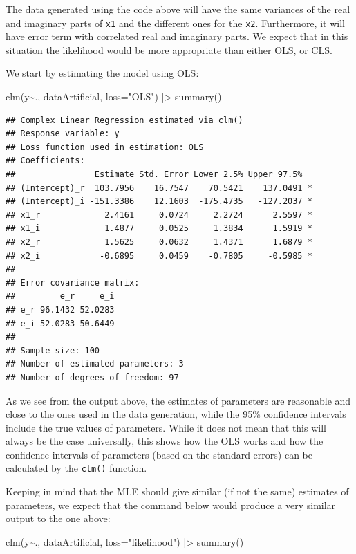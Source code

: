 \documentclass[
]{book}
\newenvironment{Shaded}{\begin{snugshade}}{\end{snugshade}}
\newcommand{\AttributeTok}[1]{\textcolor[rgb]{0.77,0.63,0.00}{#1}}
\newcommand{\FunctionTok}[1]{\textcolor[rgb]{0.00,0.00,0.00}{#1}}
\newcommand{\NormalTok}[1]{#1}
\newcommand{\SpecialCharTok}[1]{\textcolor[rgb]{0.00,0.00,0.00}{#1}}
\newcommand{\StringTok}[1]{\textcolor[rgb]{0.31,0.60,0.02}{#1}}
\begin{document}
The data generated using the code above will have the same variances of the real and imaginary parts of \texttt{x1} and the different ones for the \texttt{x2}. Furthermore, it will have error term with correlated real and imaginary parts. We expect that in this situation the likelihood would be more appropriate than either OLS, or CLS.

We start by estimating the model using OLS:

\begin{Shaded}
\begin{Highlighting}[]
\FunctionTok{clm}\NormalTok{(y}\SpecialCharTok{\textasciitilde{}}\NormalTok{., dataArtificial, }\AttributeTok{loss=}\StringTok{"OLS"}\NormalTok{) }\SpecialCharTok{|\textgreater{}}
    \FunctionTok{summary}\NormalTok{()}
\end{Highlighting}
\end{Shaded}

\begin{verbatim}
## Complex Linear Regression estimated via clm()
## Response variable: y
## Loss function used in estimation: OLS
## Coefficients:
##                Estimate Std. Error Lower 2.5% Upper 97.5%  
## (Intercept)_r  103.7956    16.7547    70.5421    137.0491 *
## (Intercept)_i -151.3386    12.1603  -175.4735   -127.2037 *
## x1_r             2.4161     0.0724     2.2724      2.5597 *
## x1_i             1.4877     0.0525     1.3834      1.5919 *
## x2_r             1.5625     0.0632     1.4371      1.6879 *
## x2_i            -0.6895     0.0459    -0.7805     -0.5985 *
## 
## Error covariance matrix:
##         e_r     e_i
## e_r 96.1432 52.0283
## e_i 52.0283 50.6449
## 
## Sample size: 100
## Number of estimated parameters: 3
## Number of degrees of freedom: 97
\end{verbatim}

As we see from the output above, the estimates of parameters are reasonable and close to the ones used in the data generation, while the 95\% confidence intervals include the true values of parameters. While it does not mean that this will always be the case universally, this shows how the OLS works and how the confidence intervals of parameters (based on the standard errors) can be calculated by the \texttt{clm()} function.

Keeping in mind that the MLE should give similar (if not the same) estimates of parameters, we expect that the command below would produce a very similar output to the one above:

\begin{Shaded}
\begin{Highlighting}[]
\FunctionTok{clm}\NormalTok{(y}\SpecialCharTok{\textasciitilde{}}\NormalTok{., dataArtificial, }\AttributeTok{loss=}\StringTok{"likelihood"}\NormalTok{) }\SpecialCharTok{|\textgreater{}}
    \FunctionTok{summary}\NormalTok{()}
\end{Highlighting}
\end{Shaded}
\end{document}
